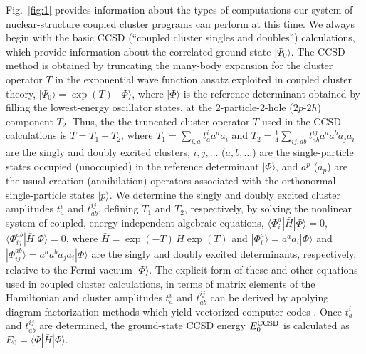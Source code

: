 \documentclass[epj]{svjour}
\begin{document}
Fig.~\ref{fig:1} provides information about the types of
computations our system of nuclear-structure
coupled cluster programs can perform at this time. We always begin with the
basic CCSD (``coupled cluster singles and doubles'') calculations,
which provide information about the correlated ground state $\mid\Psi_{0}\rangle$.
The CCSD method \cite{purvis82} is obtained by truncating the many-body
expansion for the cluster operator $T$ in the exponential wave function
ansatz exploited in coupled cluster theory,
$\mid\Psi_{0}\rangle = \exp(T)\mid\Phi\rangle$,
where $\mid\Phi\rangle$ is the reference determinant
obtained by filling the lowest-energy oscillator states,
at the 2-particle-2-hole ($2p\mbox{-}2h$) component $T_{2}$. Thus, the
the truncated cluster operator $T$ used in the CCSD calculations
is $T = T_{1} 
+ T_{2}$, where $T_1=\sum_{i,a} t_a^i a^{a} a_{i}$ and
$T_2= \frac{1}{4} \sum_{ij,ab} t_{ab}^{ij} a^{a} a^{b} a_{j} a_{i}$ are the singly
and doubly excited clusters, $i,j,\ldots$ ($a,b,\ldots$)
are the single-particle states occupied (unoccupied) in the reference determinant
$|\Phi\rangle$, and $a^{p}$ ($a_{p}$) are
the usual creation (annihilation) operators associated with
the orthonormal single-particle states $|p\rangle$.
We determine the
singly and doubly excited cluster amplitudes $t_a^i$ and
$t_{ab}^{ij}$, defining $T_1$ and $T_2$, respectively,
by solving the
nonlinear system of coupled, energy-independent algebraic equations,
$\langle \Phi_{i}^{a} | \bar{H}|\Phi\rangle = 0$,
$\langle \Phi_{ij}^{ab} | \bar{H}|\Phi\rangle = 0$,
where $\bar{H} = \exp(-T) \, H \exp(T)$
and $|\Phi_{i}^{a}\rangle = a^{a} a_{i} |\Phi\rangle$
and $|\Phi_{ij}^{ab}\rangle = a^{a} a^{b} a_{j} a_{i} |\Phi\rangle$ are
the singly and doubly
excited determinants, respectively, relative to the Fermi vacuum $|\Phi\rangle$.
The explicit form of these and other equations used in coupled cluster
calculations, in terms of matrix elements of the Hamiltonian
and cluster amplitudes
$t_a^i$ and $t_{ab}^{ij}$ can be derived by applying
diagram factorization methods which yield vectorized
computer codes \cite{cpc,creom:open}. Once $t_a^i$ and $t_{ab}^{ij}$ are determined,
the ground-state CCSD energy $E_{0}^{\rm CCSD}$ is calculated as
$E_{0} = \langle\Phi|\bar{H}|\Phi\rangle$.
\end{document}
